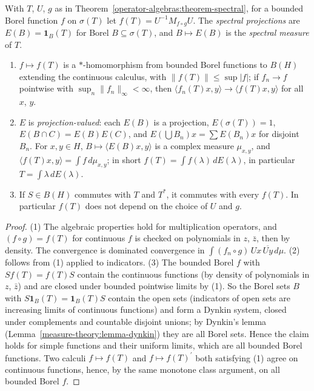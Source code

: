 \begin{definition}\label{operator-algebras:definition-borel-calculus}
With $T$, $U$, $g$ as in Theorem~\ref{operator-algebras:theorem-spectral}, for a bounded Borel function $f$ on $\sigma(T)$ let $f(T) = U^{-1}M_{f \circ g}U$. The \emph{spectral projections} are $E(B) = \mathbf{1}_B(T)$ for Borel
$B \subseteq \sigma(T)$, and $B \mapsto E(B)$ is the \emph{spectral measure} of $T$.
\end{definition}

\begin{proposition}\label{operator-algebras:proposition-borel-calculus}
\begin{enumerate}
\item $f \mapsto f(T)$ is a $*$-homomorphism from bounded Borel functions to $B(H)$ extending the continuous calculus, with $\|f(T)\| \leq \sup|f|$; if $f_n \to f$ pointwise with $\sup_n\|f_n\|_\infty < \infty$, then
$\langle f_n(T)x, y\rangle \to \langle f(T)x, y\rangle$ for all $x$, $y$.
\item $E$ is \emph{projection-valued}: each $E(B)$ is a projection, $E(\sigma(T)) = 1$, $E(B \cap C) = E(B)E(C)$, and $E(\bigcup B_n)x = \sum E(B_n)x$ for disjoint $B_n$. For $x, y \in H$, $B \mapsto \langle E(B)x, y\rangle$ is a complex
measure $\mu_{x,y}$, and $\langle f(T)x, y\rangle = \int f\,d\mu_{x,y}$; in short $f(T) = \int f(\lambda)\,dE(\lambda)$, in particular $T = \int\lambda\,dE(\lambda)$.
\item If $S \in B(H)$ commutes with $T$ and $T^*$, it commutes with every $f(T)$. In particular $f(T)$ does not depend on the choice of $U$ and $g$.
\end{enumerate}
\end{proposition}

\begin{proof}
(1) The algebraic properties hold for multiplication operators, and $(f \circ g) = f(T)$ for continuous $f$ is checked on polynomials in $z$, $\bar z$, then by density. The convergence is dominated convergence in
$\int(f_n \circ g)\,Ux\,\overline{Uy}\,d\mu$. (2) follows from (1) applied to indicators. (3) The bounded Borel $f$ with $Sf(T) = f(T)S$ contain the continuous functions (by density of polynomials in $z$, $\bar z$) and are
closed under bounded pointwise limits by (1). So the Borel sets $B$ with $S\mathbf{1}_B(T) = \mathbf{1}_B(T)S$ contain the open sets (indicators of open sets are increasing limits of continuous functions) and form a
Dynkin system, closed under complements and countable disjoint unions; by Dynkin's lemma (Lemma~\ref{measure-theory:lemma-dynkin}) they are all Borel sets. Hence the claim holds for simple functions and their uniform
limits, which are all bounded Borel functions. Two calculi $f \mapsto f(T)$ and $f \mapsto f(T)^{\prime}$ both satisfying (1) agree on continuous functions, hence, by the same monotone class argument, on all bounded Borel $f$.
\end{proof}

